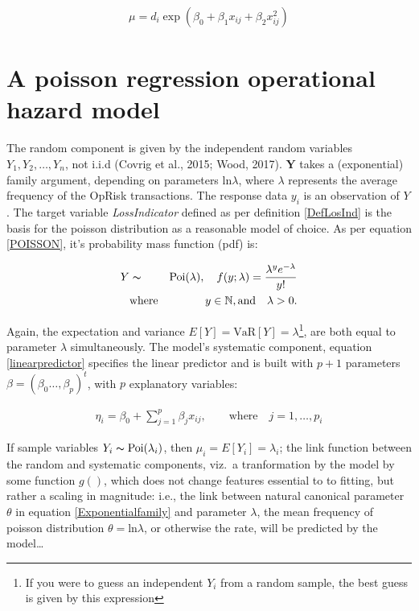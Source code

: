 \documentclass{DissertateUSU}
\begin{document}
\singlespacing

\begin{eqnarray}\label{eqn:adaptedpoisson}
\mu = d_i\exp{(\beta_0 + \beta_1x_{ij} + \beta_2x_{ij}^2)} 
\end{eqnarray} \doublespacing

\section{A poisson regression operational hazard model}
\label{sec:A poisson regression operational hazard model}

The random component is given by the independent random variables
\(Y_1, Y_2,\ldots, Y_n\), not i.i.d (Covrig et al., 2015; Wood, 2017).
\(\mathbf{Y}\) takes a (exponential) family argument, depending on
parameters \(\mbox{ln}\lambda\), where \(\lambda\) represents the
average frequency of the OpRisk transactions. The response data \(y_i\)
is an observation of \(Y\). The target variable \emph{LossIndicator}
defined as per definition \ref{DefLosInd} is the basis for the poisson
distribution as a reasonable model of choice. As per equation
\ref{POISSON}, it's probability mass function (pdf) is:

\singlespacing

\begin{eqnarray}\label{eqn:Poisson}
Y &\thicksim & \mbox{Poi}(\lambda), \quad f(y;\lambda) = \frac{\lambda^y e^{-\lambda}}{y!}\\
 &\mbox{where}& \quad y \in  \mathbb{N}, \mbox{and} \quad \lambda > 0. \nonumber
\end{eqnarray} \doublespacing

Again, the expectation and variance
\(E[Y] = \mbox{VaR}[Y] = \lambda\)\footnote{If you were to guess an independent $Y_i$ from a random sample, the best guess is given by this expression},
are both equal to parameter \(\lambda\) simultaneously. The model's
systematic component, equation \ref{linearpredictor} specifies the
linear predictor and is built with \(p + 1\) parameters
\(\beta = (\beta_0\ldots,\beta_p)^t\), with \(p\) explanatory variables:

\singlespacing

\begin{eqnarray}
\eta_i = \beta_0 + \sum_{j=1}^{p}\beta_jx_{ij}, \qquad \mbox{where} \quad j = 1,\ldots,p_i
\end{eqnarray} \doublespacing

If sample variables \(Y_i \thicksim \mbox{Poi}(\lambda_i)\), then
\(\mu_i = E[Y_i] = \lambda_i\); the link function between the random and
systematic components, viz.~a tranformation by the model by some
function \(g()\), which does not change features essential to to
fitting, but rather a scaling in magnitude: i.e., the link between
natural canonical parameter \(\theta\) in equation
\ref{Exponentialfamily} and parameter \(\lambda\), the mean frequency of
poisson distribution \(\theta = \mbox{ln}\lambda\), or otherwise the
rate, will be predicted by the model\ldots
\end{document}
